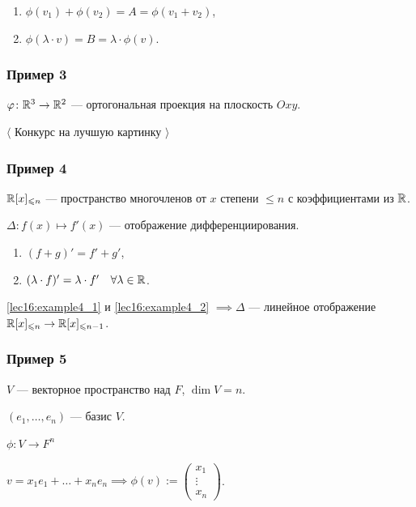 \bigskip
\begin{enumerate}[label=\arabic*), nosep]
\item $\phi(v_1) + \phi(v_2) = A = \phi(v_1 + v_2)$,
\item $\phi(\lambda \cdot v) = B = \lambda \cdot \phi(v)$.
\end{enumerate}

\subsubsection{Пример 3}

$\varphi\colon \mathbb{R}^3 \to \mathbb{R}^2$ --- ортогональная проекция на плоскость $Oxy$.

\begin{center}
    $\langle$ Конкурс на лучшую картинку $\rangle$
\end{center}

\subsubsection{Пример 4}

$\mathbb{R}[x]_{\leqslant n}$ --- пространство многочленов от $x$ степени $\leq n$ с коэффициентами из $\mathbb{R}$.

$\Delta \colon f(x) \mapsto f'(x)$ --- отображение дифференциирования.

\bigskip
\begin{enumerate}[label=\arabic*), nosep]
\item \label{lec16:example4_1} $(f + g)' = f' + g'$,
\item \label{lec16:example4_2} $(\lambda \cdot f)' = \lambda \cdot f' \quad \forall \lambda \in \mathbb{R}$.
\end{enumerate}

\bigskip
\ref{lec16:example4_1} и \ref{lec16:example4_2} $\implies \Delta $ --- линейное отображение $\mathbb{R}[x]_{\leqslant n} \to \mathbb{R}[x]_{\leqslant n - 1}$.

\subsubsection{Пример 5}
\label{lec16:example_5}

$V$ --- векторное пространство над $F$, $\dim V = n$.

$(e_1, \dots, e_n)$ --- базис $V$.

$\phi \colon V \to F^n$

$v = x_1 e_1 + \dots + x_n e_n \implies \phi(v) := \begin{pmatrix} x_1 \\ \vdots \\ x_n \end{pmatrix}$.

